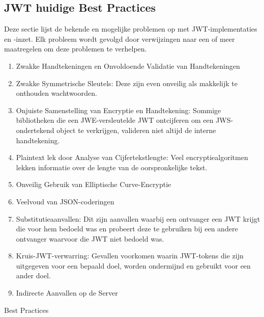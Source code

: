 \subsection{JWT huidige Best Practices}%
\label{subsec:jwt-huidige-best-practices}
Deze sectie lijst de bekende en mogelijke problemen op met JWT-implementaties en -inzet. Elk probleem wordt gevolgd door verwijzingen naar een of meer maatregelen om deze problemen te verhelpen.
\begin{enumerate}[label=\textbf{-}]
    \item Zwakke Handtekeningen en Onvoldoende Validatie van Handtekeningen
    \item Zwakke Symmetrische Sleutels: Deze zijn even onveilig als makkelijk te onthouden wachtwoorden.
    \item Onjuiste Samenstelling van Encryptie en Handtekening: Sommige bibliotheken die een JWE-versleutelde JWT ontcijferen om een JWS-ondertekend object te verkrijgen, valideren niet altijd de interne handtekening.
    \item Plaintext lek door Analyse van Cijfertekstlengte: Veel encryptiealgoritmen lekken informatie over de lengte van de oorspronkelijke tekst.
    \item Onveilig Gebruik van Elliptische Curve-Encryptie
    \item Veelvoud van JSON-coderingen
    \item Substitutieaanvallen: Dit zijn aanvallen waarbij een ontvanger een JWT krijgt die voor hem bedoeld was en probeert deze te gebruiken bij een andere ontvanger waarvoor die JWT niet bedoeld was.
    \item Kruis-JWT-verwarring: Gevallen voorkomen waarin JWT-tokens die zijn uitgegeven voor een bepaald doel, worden ondermijnd en gebruikt voor een ander doel.
    \item Indirecte Aanvallen op de Server
\end{enumerate}
Best Practices
